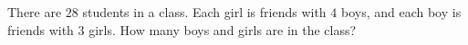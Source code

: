There are $28$ students in a class. Each girl is friends with $4$ boys, and each boy is friends with $3$ girls. How many boys and girls are in the class?
